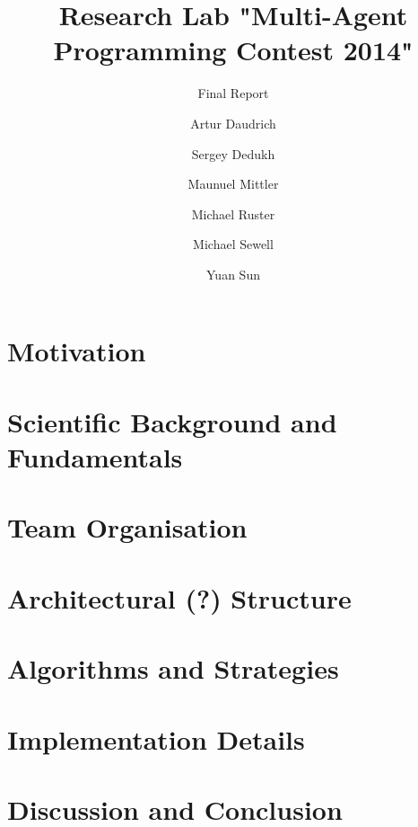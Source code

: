 \documentclass{../tech_reports/template/llncs}
\title{Research Lab "Multi-Agent Programming Contest 2014"}
\subtitle{Final Report}
\author{Artur Daudrich \and Sergey Dedukh \and Maunuel Mittler \and Michael Ruster \and Michael Sewell \and Yuan Sun}
\institute{University of Koblenz-Landau, Koblenz Campus}
\begin{document}
\maketitle

\section{Motivation}


\section{Scientific Background and Fundamentals}


\section{Team Organisation}


\section{Architectural (?) Structure}


\section{Algorithms and Strategies}


\section{Implementation Details}


\section{Discussion and Conclusion}



\clearpage

\end{document}
